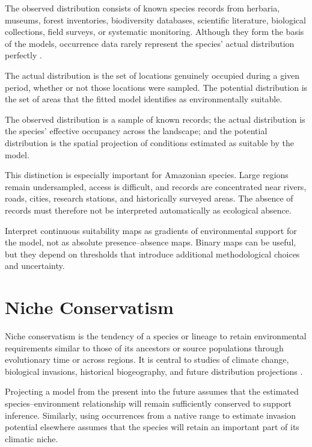 The observed distribution consists of known species records from herbaria,
museums, forest inventories, biodiversity databases, scientific literature,
biological collections, field surveys, or systematic monitoring. Although they
form the basis of the models, occurrence data rarely represent the species'
actual distribution perfectly \parencite{hijmans2021,guisan2017habitat}.

The actual distribution is the set of locations genuinely occupied during a
given period, whether or not those locations were sampled. The potential
distribution is the set of areas that the fitted model identifies as
environmentally suitable.

\begin{conceito}
The observed distribution is a sample of known records; the actual distribution
is the species' effective occupancy across the landscape; and the potential
distribution is the spatial projection of conditions estimated as suitable by
the model.
\end{conceito}

This distinction is especially important for Amazonian species. Large regions
remain undersampled, access is difficult, and records are concentrated near
rivers, roads, cities, research stations, and historically surveyed areas. The
absence of records must therefore not be interpreted automatically as
ecological absence.

\begin{dica}
Interpret continuous suitability maps as gradients of environmental support for
the model, not as absolute presence--absence maps. Binary maps can be useful,
but they depend on thresholds that introduce additional methodological choices
and uncertainty.
\end{dica}

\section{Niche Conservatism}

Niche conservatism is the tendency of a species or lineage to retain
environmental requirements similar to those of its ancestors or source
populations through evolutionary time or across regions. It is central to
studies of climate change, biological invasions, historical biogeography, and
future distribution projections
\parencite{peterson2011,guisan2017habitat,raes2018modeling}.

Projecting a model from the present into the future assumes that the estimated
species--environment relationship will remain sufficiently conserved to support
inference. Similarly, using occurrences from a native range to estimate invasion
potential elsewhere assumes that the species will retain an important part of
its climatic niche.

